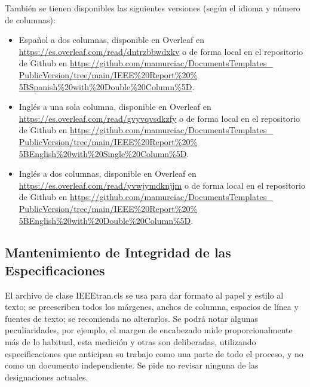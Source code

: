 \documentclass[letterpaper, 10pt, conference]{IEEEtran} %
\begin{document}
	También se tienen disponibles las siguientes versiones (según el idioma y número de columnas):
	\begin{itemize}
		\item Español a dos columnas, disponible en Overleaf en \href{https://es.overleaf.com/read/dntrzbbwdxkv}{https://es.overleaf.com/read/dntrzbbwdxkv} o de forma local en el repositorio de Github en \href{https://github.com/mamurciac/DocumentsTemplates_PublicVersion/tree/main/IEEE%20Report%20%5BSpanish%20with%20Double%20Column%5D}{https://github.com/mamurciac/DocumentsTemplates\_ PublicVersion/tree/main/IEEE\%20Report\%20\% 5BSpanish\%20with\%20Double\%20Column\%5D}.
		\item Inglés a una sola columna, disponible en Overleaf en \href{https://es.overleaf.com/read/gvyvqvsdkzfy}{https://es.overleaf.com/read/gvyvqvsdkzfy} o de forma local en el repositorio de Github en \href{https://github.com/mamurciac/DocumentsTemplates_PublicVersion/tree/main/IEEE%20Report%20%5BEnglish%20with%20Single%20Column%5D}{https://github.com/mamurciac/DocumentsTemplates\_ PublicVersion/tree/main/IEEE\%20Report\%20\% 5BEnglish\%20with\%20Single\%20Column\%5D}.
		\item Inglés a dos columnas, disponible en Overleaf en \href{https://es.overleaf.com/read/yvwjymdknjjm}{https://es.overleaf.com/read/yvwjymdknjjm} o de forma local en el repositorio de Github en \href{https://github.com/mamurciac/DocumentsTemplates_PublicVersion/tree/main/IEEE%20Report%20%5BEnglish%20with%20Double%20Column%5D}{https://github.com/mamurciac/DocumentsTemplates\_ PublicVersion/tree/main/IEEE\%20Report\%20\% 5BEnglish\%20with\%20Double\%20Column\%5D}.
	\end{itemize}
	
	\subsection{Mantenimiento de Integridad de las Especificaciones} \label{subseccionMantenimientoDeIntegridadDeLasEspecificaciones}
	El archivo de clase IEEEtran.cls se usa para dar formato al papel y estilo al texto; se preescriben todos los márgenes, anchos de columna, espacios de línea y fuentes de texto; se recomienda no alterarlos. Se podrá notar algunas peculiaridades, por ejemplo, el margen de encabezado mide proporcionalmente más de lo habitual, esta medición y otras son deliberadas, utilizando especificaciones que anticipan su trabajo como una parte de todo el proceso, y no como un documento independiente. Se pide no revisar ninguna de las designaciones actuales.
	
\end{document}
